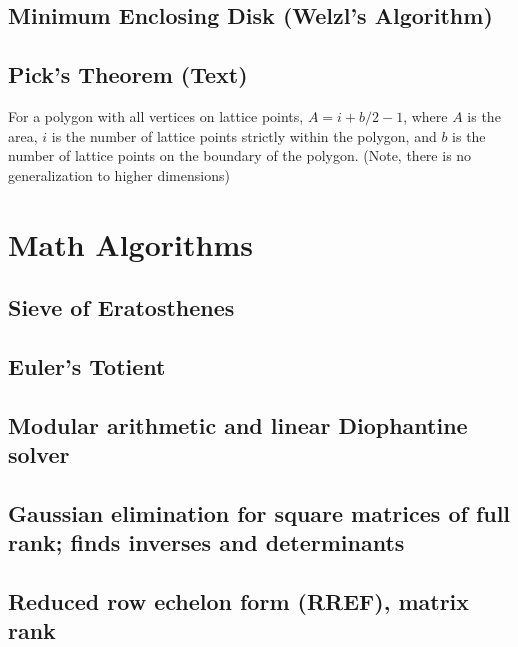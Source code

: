 \documentclass[10pt]{extarticle}
\begin{document}
\begin{multicols*}{3}
\subsection{Minimum Enclosing Disk (Welzl's Algorithm)} %


\subsection{Pick's Theorem (Text)} %
For a polygon with all vertices on lattice points, $A = i + b/2 - 1$, where $A$
is the area, $i$ is the number of lattice points strictly within the polygon,
and $b$ is the number of lattice points on the boundary of the polygon. (Note,
there is no generalization to higher dimensions)

\section{Math Algorithms}

\subsection{Sieve of Eratosthenes}


\subsection{Euler's Totient} %


\subsection{Modular arithmetic and linear Diophantine solver} %


\subsection{Gaussian elimination for square matrices of full rank; finds
inverses and determinants} %


\subsection{Reduced row echelon form (RREF), matrix rank} %



\end{multicols*}
\end{document}
